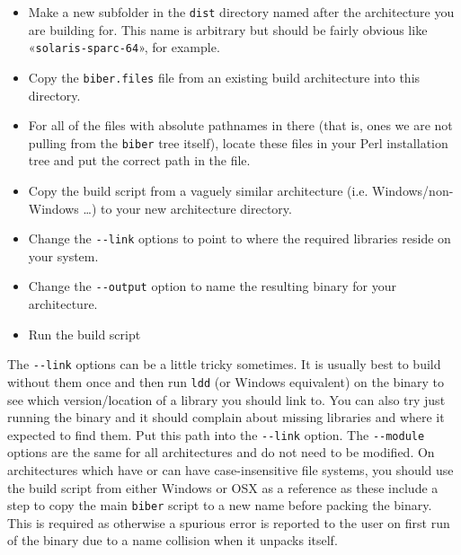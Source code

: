 \documentclass{ltxdockit}
\begin{document}
\begin{itemize}
\item Make a new subfolder in the \verb+dist+ directory named after the
  architecture you are building for. This name is arbitrary but should
  be fairly obvious like «\verb+solaris-sparc-64+», for example.
\item Copy the \verb+biber.files+ file from an existing build
  architecture into this directory.
\item For all of the files with absolute pathnames in there (that is,
  ones we are not pulling from the \verb+biber+ tree itself), locate these
  files in your Perl installation tree and put the correct path in the
  file.
\item Copy the build script from a vaguely similar architecture
  (i.e. Windows/non-Windows \ldots) to your new architecture
  directory. 
\item Change the \verb+--link+ options to point to where the required
  libraries reside on your system.
\item Change the \verb+--output+ option to name the resulting binary
  for your architecture.
\item Run the build script
\end{itemize}

\noindent The \verb+--link+ options can be a little tricky
sometimes. It is usually best to build without them once and then run
\verb+ldd+ (or Windows equivalent) on the binary to see which
version/location of a library you should link to. You can also try
just running the binary and it should complain about missing libraries
and where it expected to find them. Put this path into the
\verb+--link+ option. The \verb+--module+ options are the same for all
architectures and do not need to be modified.
On architectures which have or can have case-insensitive file systems,
you should use the build script from either Windows or OSX as a reference
as these include a step to copy the main \verb+biber+ script to a new name
before packing the binary. This is required as otherwise a spurious
error is reported to the user on first run of the binary due to a name
collision when it unpacks itself.
\end{document}

